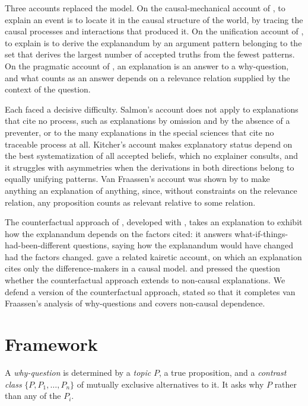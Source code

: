 \documentclass{situationist-preprint}
\begin{document}
Three accounts replaced the model. On the causal-mechanical account of \citet{Salmon1984}, to explain an event is to locate it in the causal structure of the world, by tracing the causal processes and interactions that produced it. On the unification account of \citet{Kitcher1989}, to explain is to derive the explanandum by an argument pattern belonging to the set that derives the largest number of accepted truths from the fewest patterns. On the pragmatic account of \citet[ch.~5]{vanFraassen1980}, an explanation is an answer to a why-question, and what counts as an answer depends on a relevance relation supplied by the context of the question.

Each faced a decisive difficulty. Salmon's account does not apply to explanations that cite no process, such as explanations by omission and by the absence of a preventer, or to the many explanations in the special sciences that cite no traceable process at all. Kitcher's account makes explanatory status depend on the best systematization of all accepted beliefs, which no explainer consults, and it struggles with asymmetries when the derivations in both directions belong to equally unifying patterns. Van Fraassen's account was shown by \citet{KitcherSalmon1987} to make anything an explanation of anything, since, without constraints on the relevance relation, any proposition counts as relevant relative to some relation.

The counterfactual approach of \citet{Woodward2003}, developed with \citet{WoodwardHitchcock2003}, takes an explanation to exhibit how the explanandum depends on the factors cited: it answers what-if-things-had-been-different questions, saying how the explanandum would have changed had the factors changed. \citet{Strevens2008} gave a related kairetic account, on which an explanation cites only the difference-makers in a causal model. \citet{Reutlinger2016} and \citet{Lange2017} pressed the question whether the counterfactual approach extends to non-causal explanations. We defend a version of the counterfactual approach, stated so that it completes van Fraassen's analysis of why-questions and covers non-causal dependence.

\section{Framework}\label{s:framework}

\begin{definition}\label{d:question}
A \emph{why-question} is determined by a \emph{topic} $P$, a true proposition, and a \emph{contrast class} $\{P, P_1, \dots, P_n\}$ of mutually exclusive alternatives to it. It asks why $P$ rather than any of the $P_i$.
\end{definition}
\end{document}
